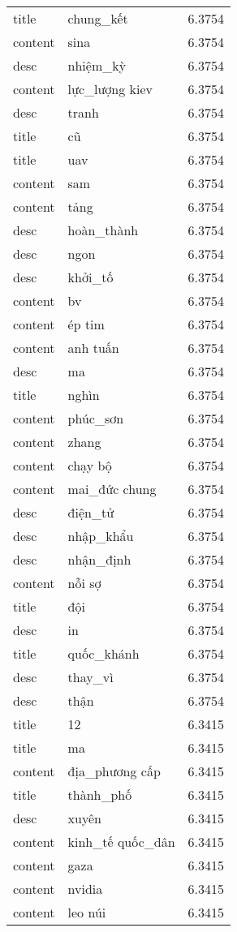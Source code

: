 \documentclass{article}
\begin{document}
\begin{tabular}{lll}
title & chung\_kết & 6.3754\\
content & sina & 6.3754\\
desc & nhiệm\_kỳ & 6.3754\\
content & lực\_lượng kiev & 6.3754\\
desc & tranh & 6.3754\\
title & cũ & 6.3754\\
title & uav & 6.3754\\
content & sam & 6.3754\\
content & tảng & 6.3754\\
desc & hoàn\_thành & 6.3754\\
desc & ngon & 6.3754\\
desc & khởi\_tố & 6.3754\\
content & bv & 6.3754\\
content & ép tim & 6.3754\\
content & anh tuấn & 6.3754\\
desc & ma & 6.3754\\
title & nghìn & 6.3754\\
content & phúc\_sơn & 6.3754\\
content & zhang & 6.3754\\
content & chạy bộ & 6.3754\\
content & mai\_đức chung & 6.3754\\
desc & điện\_tử & 6.3754\\
desc & nhập\_khẩu & 6.3754\\
desc & nhận\_định & 6.3754\\
content & nỗi sợ & 6.3754\\
title & đội & 6.3754\\
desc & in & 6.3754\\
title & quốc\_khánh & 6.3754\\
desc & thay\_vì & 6.3754\\
desc & thận & 6.3754\\
title & 12 & 6.3415\\
title & ma & 6.3415\\
content & địa\_phương cấp & 6.3415\\
title & thành\_phố & 6.3415\\
desc & xuyên & 6.3415\\
content & kinh\_tế quốc\_dân & 6.3415\\
content & gaza & 6.3415\\
content & nvidia & 6.3415\\
content & leo núi & 6.3415\\

\end{tabular}
\end{document}
